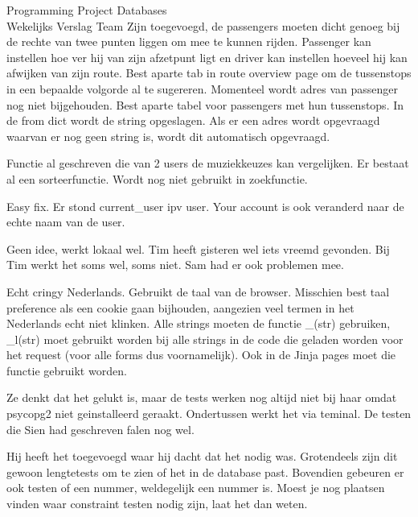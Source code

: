 \documentclass{article}
\newcounter{team}
\begin{document}
\begin{Minutes}{Programming Project Databases \\ Wekelijks Verslag Team }
		            Zijn toegevoegd, de passengers moeten dicht genoeg bij de rechte van twee punten liggen om mee te kunnen rijden. Passenger kan instellen hoe ver hij van zijn afzetpunt ligt en driver kan instellen hoeveel hij kan afwijken van zijn route. Best aparte tab in route overview page om de tussenstops in een bepaalde volgorde al te sugereren. Momenteel wordt adres van passenger nog niet bijgehouden. Best aparte tabel voor passengers met hun tussenstops.
		            In de from dict wordt de string opgeslagen. Als er een adres wordt opgevraagd waarvan er nog geen string is, wordt dit automatisch opgevraagd.

		            Functie al geschreven die van 2 users de muziekkeuzes kan vergelijken. Er bestaat al een sorteerfunctie. Wordt nog niet gebruikt in zoekfunctie.

		            Easy fix. Er stond current\_user ipv user. Your account is ook veranderd naar de echte naam van de user.

		            Geen idee, werkt lokaal wel. Tim heeft gisteren wel iets vreemd gevonden. Bij Tim werkt het soms wel, soms niet. Sam had er ook problemen mee.

		            Echt cringy Nederlands. Gebruikt de taal van de browser. Misschien best taal preference als een cookie gaan bijhouden, aangezien veel termen in het Nederlands echt niet klinken. Alle strings moeten de functie \_(str) gebruiken, \_l(str) moet gebruikt worden bij alle strings in de code die geladen worden voor het request (voor alle forms dus voornamelijk). Ook in de Jinja pages moet die functie gebruikt worden.

				    Ze denkt dat het gelukt is, maar de tests werken nog altijd niet bij haar omdat psycopg2 niet geinstalleerd geraakt. Ondertussen werkt het via teminal. De testen die Sien had geschreven falen nog wel.

				    Hij heeft het toegevoegd waar hij dacht dat het nodig was. Grotendeels zijn dit gewoon lengtetests om te zien of het in de database past. Bovendien gebeuren er ook testen of een nummer, weldegelijk een nummer is. Moest je nog plaatsen vinden waar constraint testen nodig zijn, laat het dan weten.


\end{Minutes}
\end{document}
